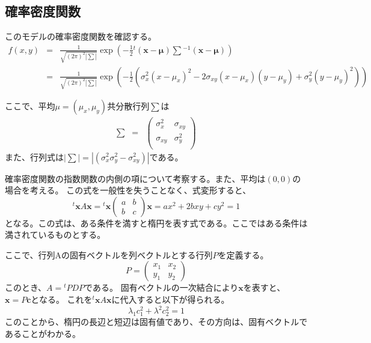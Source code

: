 \subsection{確率密度関数}
このモデルの確率密度関数を確認する。
\begin{eqnarray*}
 f(x,y)&=& \frac{1}{\sqrt{(2\pi)^2|\sum|}} \exp\left( -\frac{1}{2} {}^t\!(\bm{x-\mu})\sum\! ^{-1}(\bm{x-\mu}) \right) \\
 &= &\frac{1}{\sqrt{(2\pi)^2|\sum|}} \exp\left( -\frac{1}{2}  \left(\sigma_x^2(x-\mu_x)^2 -2\sigma_{xy}(x-\mu_x)(y-\mu_y)+\sigma_y^2(y-\mu_y)^2\right) \right)
\end{eqnarray*}


ここで、平均$\mu=(\mu_x,\mu_y)$共分散行列$\sum$は
\begin{eqnarray*}
 \sum &=& \begin{pmatrix}
\sigma_x^2 &  \sigma_{xy}\\
           \sigma_{xy}& \sigma_y^2 \\
\end{pmatrix}
\end{eqnarray*}
また、行列式は$|\sum| = |(\sigma_x^2\sigma_y^2-\sigma_{xy}^2)|$である。


確率密度関数の指数関数の内側の項について考察する。また、平均は$(0,0)$の場合を考える。
この式を一般性を失うことなく、式変形すると、
\begin{equation*}
 {}^t\!\bm{x}A\bm{x}=
 {}^t\!\bm{x}\begin{pmatrix}
  a & b \\
  b & c 
 \end{pmatrix}\bm{x}= ax^2+2bxy+cy^2 = 1
\end{equation*}
となる。この式は、ある条件を満すと楕円を表す式である。ここではある条件は満されているものとする。



ここで、行列Aの固有ベクトルを列ベクトルとする行列$P$を定義する。
\begin{equation*}
 P = \begin{pmatrix}
      x_1 & x_2\\
      y_1 & y_2
     \end{pmatrix}
\end{equation*}
このとき、$A={}^t\!PDP$である。
固有ベクトルの一次結合により$\bm{x}$を表すと、$\bm{x}=P\bm{c}$となる。
これを${}^t\!\bm{x}A\bm{x}$に代入すると以下が得られる。
\begin{equation*}
 \lambda_1 c_1^2+\lambda^2 c_2^2=1
\end{equation*}
このことから、楕円の長辺と短辺は固有値であり、その方向は、固有ベクトルであることがわかる。



